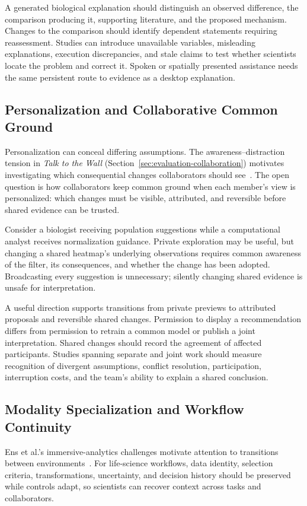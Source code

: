A generated biological explanation should distinguish an observed difference, the comparison producing it, supporting literature, and the proposed mechanism. Changes to the comparison should identify dependent statements requiring reassessment. Studies can introduce unavailable variables, misleading explanations, execution discrepancies, and stale claims to test whether scientists locate the problem and correct it. Spoken or spatially presented assistance needs the same persistent route to evidence as a desktop explanation.

\subsection{Personalization and Collaborative Common Ground}
\label{sec:challenges-personalization}
Personalization can conceal differing assumptions. The awareness--distraction tension in \emph{Talk to the Wall} (Section~\ref{sec:evaluation-collaboration}) motivates investigating which consequential changes collaborators should see~\cite{EvalMolinaLeon2025}. The open question is how collaborators keep common ground when each member's view is personalized: which changes must be visible, attributed, and reversible before shared evidence can be trusted.

Consider a biologist receiving population suggestions while a computational analyst receives normalization guidance. Private exploration may be useful, but changing a shared heatmap's underlying observations requires common awareness of the filter, its consequences, and whether the change has been adopted. Broadcasting every suggestion is unnecessary; silently changing shared evidence is unsafe for interpretation.

A useful direction supports transitions from private previews to attributed proposals and reversible shared changes. Permission to display a recommendation differs from permission to retrain a common model or publish a joint interpretation. Shared changes should record the agreement of affected participants. Studies spanning separate and joint work should measure recognition of divergent assumptions, conflict resolution, participation, interruption costs, and the team's ability to explain a shared conclusion.

\subsection{Modality Specialization and Workflow Continuity}
\label{sec:challenges-continuity}
\label{sec:modality-continuity}
Ens et al.'s immersive-analytics challenges motivate attention to transitions between environments~\cite{Ens2021GrandChallenges}. For life-science workflows, data identity, selection criteria, transformations, uncertainty, and decision history should be preserved while controls adapt, so scientists can recover context across tasks and collaborators.


